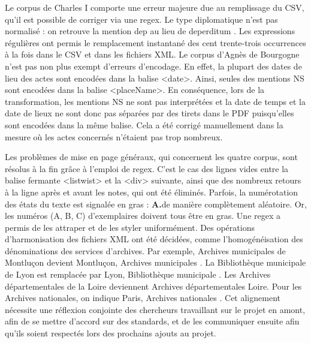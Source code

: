 \par Le corpus de Charles I comporte une erreur majeure due au remplissage du CSV, qu'il est possible de corriger via une regex. Le type diplomatique n'est pas normalisé : on retrouve la mention \og dep \fg \space au lieu de \og deperditum \fg. Les expressions régulières ont permis le remplacement instantané des cent trente-trois occurrences à la fois dans le CSV et dans les fichiers XML. Le corpus d'Agnès de Bourgogne n'est pas non plus exempt d'erreurs d'encodage. En effet, la plupart des dates de lieu des actes sont encodées dans la balise <date>. Ainsi, seules des mentions \og NS \fg \space sont encodées dans la balise <placeName>. En conséquence, lors de la transformation, les mentions \og NS \fg \space ne sont pas interprétées et la date de temps et la date de lieux ne sont donc pas séparées par des tirets dans le PDF puisqu'elles sont encodées dans la même balise. Cela a été corrigé manuellement dans la mesure où les actes concernés n'étaient pas trop nombreux.
\newline 

\par Les problèmes de mise en page généraux, qui concernent les quatre corpus, sont résolus à la fin grâce à l'emploi de regex. C'est le cas des lignes vides entre la balise fermante <listwist> et la <div> suivante, ainsi que des nombreux retours à la ligne après et avant les notes, qui ont été éliminés. Parfois, la numérotation des états du texte est signalée en gras : \og \textbf{A.}\fg \space de manière complètement aléatoire. Or, les numéros (A, B, C) d'exemplaires doivent tous être en gras. Une regex a permis de les attraper et de les styler uniformément. Des opérations d'harmonisation des fichiers XML ont été décidées, comme l'homogénéisation des dénominations des services d'archives. Par exemple, \og Archives municipales de Montluçon \fg \space devient \og Montluçon, Archives municipales \fg. La \og Bibliothèque municipale de Lyon \fg \space est remplacée par \og Lyon, Bibliothèque municipale \fg. Les \og Archives départementales de la Loire \fg \space deviennent \og Archives départementales Loire\fg. Pour les Archives nationales, on indique \og Paris, Archives nationales \fg. Cet alignement nécessite une réflexion conjointe des chercheurs travaillant sur le projet en amont, afin de se mettre d'accord sur des standards, et de les communiquer ensuite afin qu'ils soient respectés lors des prochains ajouts au projet.
\newpage 

